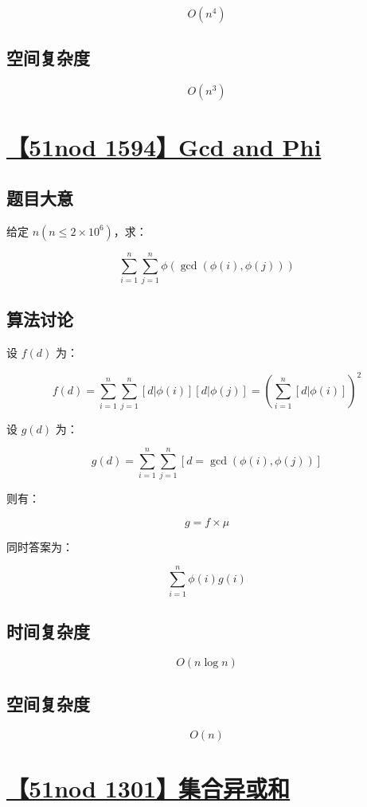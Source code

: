 \documentclass[UTF8]{article}
\begin{document}
$$
O(n^4)
$$

\subsection{空间复杂度}

$$
O(n^3)
$$

\section{\href{http://www.51nod.com/Challenge/Problem.html?problemId=1594}{【51nod 1594】Gcd and Phi}}

\subsection{题目大意}

给定 $n(n \le 2 \times 10^6)$，求：

$$
\sum_{i=1}^{n}\sum_{j=1}^{n}\phi(\gcd(\phi(i),\phi(j)))
$$

\subsection{算法讨论}

设 $f(d)$ 为：

$$
f(d)=\sum_{i=1}^{n}\sum_{j=1}^{n}[d | \phi(i)][d | \phi(j)]=\left(\sum_{i=1}^{n}[d | \phi(i)]\right)^2
$$

设 $g(d)$ 为：

$$
g(d)=\sum_{i=1}^{n}\sum_{j=1}^{n}[d = \gcd(\phi(i), \phi(j))]
$$

则有：

$$
g = f \times \mu
$$

同时答案为：

$$
\sum_{i=1}^{n}\phi(i)g(i)
$$

\subsection{时间复杂度}

$$
O(n \log n)
$$

\subsection{空间复杂度}

$$
O(n)
$$

\section{\href{http://www.51nod.com/Challenge/Problem.html?problemId=1301}{【51nod 1301】集合异或和}}
\end{document}
